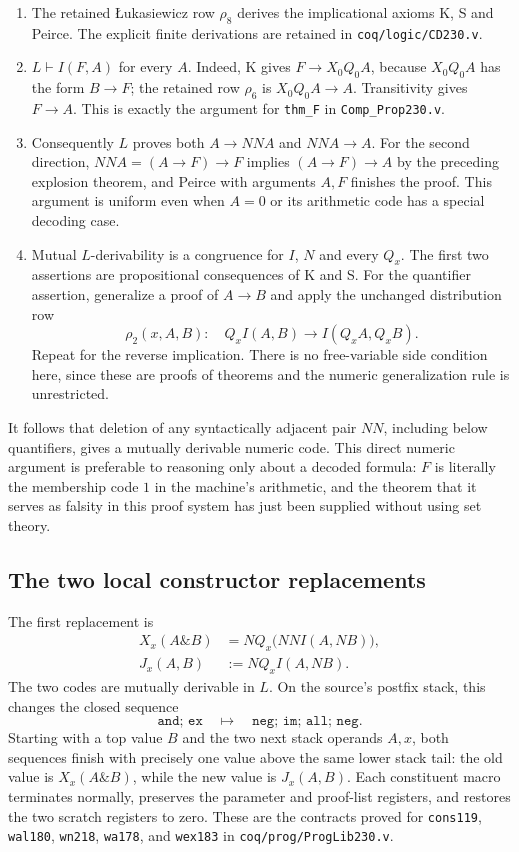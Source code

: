 \begin{enumerate}
\item The retained \L ukasiewicz row $\rho_8$ derives the implicational
axioms K, S and Peirce.  The explicit finite derivations are retained
in \texttt{coq/logic/CD230.v}.
\item $L\vdash I(F,A)$ for every $A$.  Indeed, K gives
$F\to X_0Q_0A$, because $X_0Q_0A$ has the form $B\to F$;
the retained row $\rho_6$ is $X_0Q_0A\to A$.  Transitivity gives
$F\to A$.  This is exactly the argument for
\texttt{thm\_F} in \texttt{Comp\_Prop230.v}.
\item Consequently $L$ proves both $A\to NN A$ and $NN A\to A$.
For the second direction, $NN A=(A\to F)\to F$ implies
$(A\to F)\to A$ by the preceding explosion theorem, and Peirce
with arguments $A,F$ finishes the proof.  This argument is uniform
even when $A=0$ or its arithmetic code has a special decoding case.
\item Mutual $L$-derivability is a congruence for $I$, $N$ and every
$Q_x$.  The first two assertions are propositional consequences of
K and S.  For the quantifier assertion, generalize a proof of
$A\to B$ and apply the unchanged distribution row
\[
 \rho_2(x,A,B):\quad Q_x I(A,B)\to I(Q_xA,Q_xB).
\]
Repeat for the reverse implication.  There is no free-variable side
condition here, since these are proofs of theorems and the numeric
generalization rule is unrestricted.
\end{enumerate}

It follows that deletion of any syntactically adjacent pair $NN$,
including below quantifiers, gives a mutually derivable numeric code.
This direct numeric argument is preferable to reasoning only about a
decoded formula: $F$ is literally the membership code $1$ in the
machine's arithmetic, and the theorem that it serves as falsity in
this proof system has just been supplied without using set theory.

\subsection{The two local constructor replacements}

The first replacement is
\begin{align*}
 X_x(A\mathbin{\&}B)
 &=NQ_x\bigl(NN I(A,N B)\bigr),\\
 J_x(A,B)&:=NQ_x I(A,N B).
\end{align*}
The two codes are mutually derivable in $L$.  On the source's postfix
stack, this changes the closed sequence
\[
 \texttt{and; ex}\quad\longmapsto\quad
 \texttt{neg; im; all; neg}.
\]
Starting with a top value $B$ and the two next stack operands $A,x$,
both sequences finish with precisely one value above the same lower
stack tail: the old value is $X_x(A\mathbin{\&}B)$, while the new
value is $J_x(A,B)$.  Each constituent macro terminates normally,
preserves the parameter and proof-list registers, and restores the
two scratch registers to zero.  These are the contracts proved for
\texttt{cons119}, \texttt{wal180}, \texttt{wn218},
\texttt{wa178}, and \texttt{wex183} in
\texttt{coq/prog/ProgLib230.v}.

